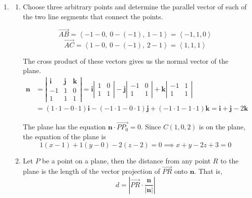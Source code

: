 \documentclass[a4paper, 12pt]{article}
\begin{document}
\begin{enumerate}[leftmargin=*,label=\textbf{\arabic*.}]
\begin{enumerate}[leftmargin=*,label=\textbf{\alph*.}]
\[\left.\frac{dy}{dx}\right|_{\left(2-\sqrt2,\:\pi/4\right)}=\frac{-2+\sqrt2}{-\sqrt2}=\sqrt2-1\]

The tangent vectors to the curve at $\theta=\dfrac\pi4$ are
\[\boxed{\left\langle k,\:k\left(\sqrt2-1\right)\right\rangle,\quad k\in\mathbb{R}}\]
\end{enumerate}

\item \begin{enumerate}[leftmargin=*,label=\textbf{\alph*.}]
\item Choose three arbitrary points and determine the parallel vector of each of the two line segments that connect the points.

\[\overrightarrow{AB}=\left\langle-1-0,\:0-(-1),\:1-1\right\rangle=\left\langle-1,1,0\right\rangle\]
\[\overrightarrow{AC}=\left\langle1-0,\:0-(-1),\:2-1\right\rangle=\left\langle1,1,1\right\rangle\]

The cross product of these vectors gives us the normal vector of the plane.
\begin{align*}\mathbf{n}&=\left|\begin{array}{ccc}
\mathbf{i}&\mathbf{j}&\mathbf{k}\\
-1&1&0\\
1&1&1
\end{array}\right|=\mathbf{i}\left|\begin{array}{cc}
1&0\\1&1
\end{array}\right|-\mathbf{j}\left|\begin{array}{cc}
-1&0\\1&1
\end{array}\right|+\mathbf{k}\left|\begin{array}{cc}
-1&1\\1&1
\end{array}\right|\\[1em]&=(1\cdot1-0\cdot1)\mathbf{i}-(-1\cdot1-0\cdot1)\mathbf{j}+(-1\cdot1-1\cdot1)\mathbf{k}=\mathbf i+\mathbf j-2\mathbf k\end{align*}

The plane has the equation $\mathbf n\cdot\overrightarrow{PP_0}=0$. Since $C(1,0,2)$ is on the plane, the equation of the plane is
\[\boxed{1(x-1)+1(y-0)-2(z-2)=0\implies x+y-2z+3=0}\]

\item Let $P$ be a point on a plane, then the distance from any point $R$ to the plane is the length of the vector projection of $\overrightarrow{PR}$ onto $\mathbf n$. That is,
\[d=\left|\overrightarrow{PR}\cdot\frac{\mathbf n}{|\mathbf n|}\right|\]


\end{enumerate}
\end{enumerate}
\end{document}
